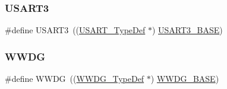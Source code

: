 \mbox{\label{group___peripheral__declaration_ga2350115553c1fe0a7bc14e6a7ec6a225}} 
\subsubsection{\texorpdfstring{USART3}{USART3}}
{\footnotesize\ttfamily \#define U\+S\+A\+R\+T3~((\mbox{\hyperlink{struct_u_s_a_r_t___type_def}{U\+S\+A\+R\+T\+\_\+\+Type\+Def}} $\ast$) \mbox{\hyperlink{group___peripheral__memory__map_gabe0d6539ac0026d598274ee7f45b0251}{U\+S\+A\+R\+T3\+\_\+\+B\+A\+SE}})}

\mbox{\label{group___peripheral__declaration_ga9821fd01757986612ddb8982e2fe27f1}} 
\subsubsection{\texorpdfstring{WWDG}{WWDG}}
{\footnotesize\ttfamily \#define W\+W\+DG~((\mbox{\hyperlink{struct_w_w_d_g___type_def}{W\+W\+D\+G\+\_\+\+Type\+Def}} $\ast$) \mbox{\hyperlink{group___peripheral__memory__map_ga9a5bf4728ab93dea5b569f5b972cbe62}{W\+W\+D\+G\+\_\+\+B\+A\+SE}})}

